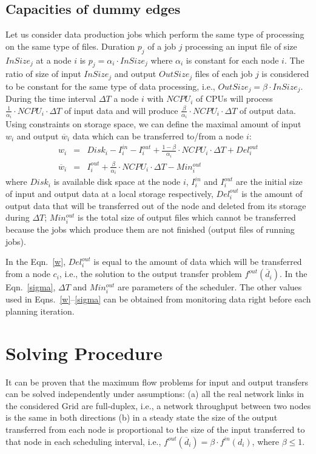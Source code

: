 \documentclass{svjour3}                     %
\begin{document}
\subsection{Capacities of dummy edges}
Let us consider data production jobs which perform the same type of processing
on the same type of files. Duration $p_{j}$ of a job $j$  processing an input
file of size $InSize_{j}$ at a node $i$ is $p_{j} = \alpha_{i} \cdot
InSize_{j}$ where $\alpha_{i}$ is constant for each node $i$.  The ratio of
size of input $InSize_{j}$ and output $OutSize_{j}$ files of each job $j$ is
considered to be constant for the same type of data processing, i.e.,
$OutSize_{j} = \beta \cdot InSize_{j}$.  During the time interval $\Delta T$ a
node $i$ with $NCPU_{i}$  of CPUs  will process $\frac{1}{\alpha_{i}} \cdot
NCPU_{i} \cdot \Delta T$ of input data and will produce
$\frac{\beta}{\alpha_{i}} \cdot NCPU_{i} \cdot \Delta T$ of output data.
Using constraints on storage space, we can define the maximal amount of input
$w_{i}$ and output $\overline{w}_{i}$ data which can be transferred to/from a
node $i$:
%
\begin{eqnarray}
w_{i} &=&
Disk_{i} - I_{i}^{in} - I_{i}^{out} + \frac{1 - \beta}{\alpha_{i}} \cdot
NCPU_{i} \cdot \Delta T + Del_{i}^{out} \label{w}\\
\overline{w}_{i} &=& I_{i}^{out} + \frac{\beta}{\alpha_{i}} \cdot NCPU_{i} \cdot \Delta T - Min_{i}^{out} \label{sigma}
\end{eqnarray}  
%
where $Disk_{i}$ is available disk space at the node $i$, $I_{i}^{in}$ and
$I_{i}^{out}$ are the initial size of input and output data at a local storage
respectively, $Del_{i}^{out}$ is the amount of output data that will be
transferred out of the node and deleted from its storage during $\Delta T$;
$Min_{i}^{out}$ is the total size of output files which cannot be transferred
because the jobs which produce them are not finished (output files of running
jobs). 

In the Eqn.~\ref{w}, $Del_{i}^{out}$ is equal to the amount of data which will
be transferred from a node $c_{i}$, i.e., the solution to the output transfer
problem $f^{out}(\overline{d}_{i})$. In the Eqn.~\ref{sigma}, $\Delta T$ and
$Min_{i}^{out}$ are parameters of the scheduler. The other values used in
Eqns.~\ref{w}--\ref{sigma} can be obtained from monitoring data right before
each planning iteration.

\section{Solving Procedure}
\label{solve}
It can be proven that the maximum flow problems for input and output transfers
can be solved independently under assumptions: (a) all the real network links
in the considered Grid are full-duplex, i.e., a network throughput between two
nodes is the same in both directions (b) in a steady state the size of the
output transferred from each node is proportional to the size of the input
transferred to that node in each scheduling interval, i.e.,
$f^{out}(\overline{d}_{i})= \beta \cdot f^{in}(d_{i})$, where $\beta \leq 1$.
\end{document}
